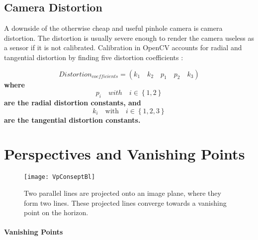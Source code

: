 \subsection{Camera Distortion}

A downside of the otherwise cheap and useful pinhole camera is camera distortion. The distortion is usually severe enough to render the camera useless as a sensor if it is not calibrated. Calibration in OpenCV accounts for radial and tangential distortion by finding five distortion coefficients \cite{3dCalib}:

\begin{equation}
Distortion_{coefficients} = (k_1 \quad k_2 \quad p_1 \quad p_2 \quad k_3)
\label{eq:distortion}
\end{equation}
\textbf{where} 
\begin{equation*}
p_i \quad with \quad i \in \left\{1, 2\right\}
\end{equation*}
\textbf{are the radial distortion constants, and}
\begin{equation*}
k_i \quad \textrm{with} \quad i \in \left\{1, 2, 3\right\}  
\end{equation*}
\textbf{are the tangential distortion constants.} 

\section{Perspectives and Vanishing Points}

\begin{wrapfigure}{r}{0.5\textwidth}
	\vspace{-10pt} %
	\centering
	\texttt{[image: VpConseptBl]}
	\caption{\label{fig:VpConseptBl}Two parallel lines are projected onto an image plane, where they form two lines. These projected lines converge towards a vanishing point on the horizon.}
	\vspace{15pt} %
\end{wrapfigure}

\paragraph{Vanishing Points}

